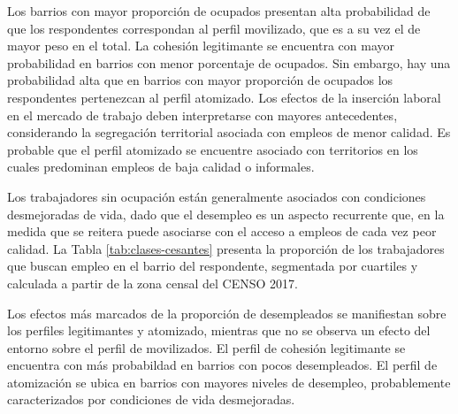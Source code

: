 \documentclass[
  12pt,
]{book}
\begin{document}
Los barrios con mayor proporción de ocupados presentan alta probabilidad de que los respondentes correspondan al perfil movilizado, que es a su vez el de mayor peso en el total. La cohesión legitimante se encuentra con mayor probabilidad en barrios con menor porcentaje de ocupados. Sin embargo, hay una probabilidad alta que en barrios con mayor proporción de ocupados los respondentes pertenezcan al perfil atomizado. Los efectos de la inserción laboral en el mercado de trabajo deben interpretarse con mayores antecedentes, considerando la segregación territorial asociada con empleos de menor calidad. Es probable que el perfil atomizado se encuentre asociado con territorios en los cuales predominan empleos de baja calidad o informales.

Los trabajadores sin ocupación están generalmente asociados con condiciones desmejoradas de vida, dado que el desempleo es un aspecto recurrente que, en la medida que se reitera puede asociarse con el acceso a empleos de cada vez peor calidad. La Tabla \ref{tab:clases-cesantes} presenta la proporción de los trabajadores que buscan empleo en el barrio del respondente, segmentada por cuartiles y calculada a partir de la zona censal del CENSO 2017.

\begin{table}

\caption{\label{tab:clases-cesantes}Efecto de la proporción de trabajadores cesantes sobre los perfiles de cohesion social}
\centering
{}
\end{table}

Los efectos más marcados de la proporción de desempleados se manifiestan sobre los perfiles legitimantes y atomizado, mientras que no se observa un efecto del entorno sobre el perfil de movilizados. El perfil de cohesión legitimante se encuentra con más probabildad en barrios con pocos desempleados. El perfil de atomización se ubica en barrios con mayores niveles de desempleo, probablemente caracterizados por condiciones de vida desmejoradas.
\end{document}
